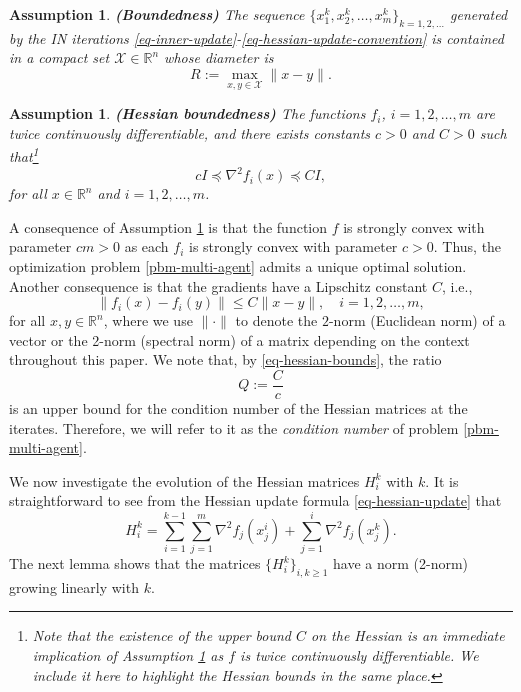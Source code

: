 \documentclass[final,numbook]{svjour3}
\newtheorem{assumption}[property]{Assumption}
\begin{document}
\begin{assumption}\label{assum-compact} \textbf{(Boundedness)} The sequence $\{x_1^k, x_2^k, \dots, x_m^k \}_{k=1,2,\dots}$ generated by the IN iterations \eqref{eq-inner-update}-\eqref{eq-hessian-update-convention} is contained in a compact set $\mathcal{X} \in {\mathbb R}^n$ whose diameter is
   \begin{equation}\label{def-R-diameter} R:=\max_{x,y \in \mathcal{X}} \|x -y\|.
   \end{equation} 
\end{assumption}
\begin{assumption}\label{assum-strong-cvx} \textbf{(Hessian boundedness)} The functions $f_i$, $i=1,2,\dots,m$ are twice continuously differentiable, and there exists constants $c>0$ and $C>0$ such that\footnote{Note that the existence of the upper bound $C$ on the Hessian is an immediate implication of Assumption \ref{assum-compact} as $f$ is twice continuously differentiable. We include it here to highlight the Hessian bounds in the same place.} 
	\begin{equation}\label{eq-hessian-bounds}  c I \preceq 		\nabla^2 f_i (x)  \preceq C I, 
 	\end{equation} 
for all $x \in {\mathbb R}^n$ and $i=1,2,\dots,m$.
\end{assumption}
A consequence of Assumption \ref{assum-strong-cvx} is that the function $f$ is strongly convex with parameter $cm>0$ as each $f_i$ is strongly convex with parameter $c>0$. Thus, the optimization problem \eqref{pbm-multi-agent} admits a unique optimal solution. Another consequence is that the gradients have a Lipschitz constant ${C}$, i.e., 
  \begin{equation}\label{eq:gradient-Lipschitzness}\|f_i(x) - f_i(y)\| \leq {C} \|x-y\|, \quad i=1,2,\dots,m,
  \end{equation}
for all $x,y \in {\mathbb R}^n$, where we use $\|\cdot\|$ to denote the $2$-norm (Euclidean norm) of a vector or the 2-norm (spectral norm) of a matrix depending on the context throughout this paper. We note that, by \eqref{eq-hessian-bounds}, the ratio
   \begin{equation}\label{def-cond-number} Q:= \frac{C}{c}
   \end{equation}
is an upper bound for the condition number of the Hessian matrices at the iterates. Therefore, we will refer to it as the \textit{condition number} of problem \eqref{pbm-multi-agent}.
 
We now investigate the evolution of the Hessian matrices $H_i^k$ with $k$. It is straightforward to see from the Hessian update formula \eqref{eq-hessian-update} that
\begin{equation}\label{eq-hessian-iterates-decompositon} H_i^k = \sum_{i=1}^{k-1} \sum_{j=1}^m \nabla^2 f_j (x_j^i) + \sum_{j=1}^i {{\nabla^2 f_j (x_j^k)}}. 
\end{equation}
The next lemma shows that the matrices $\{H_i^k\}_{i,k\geq1}$ have a norm (2-norm) growing linearly with $k$. 
\end{document}
